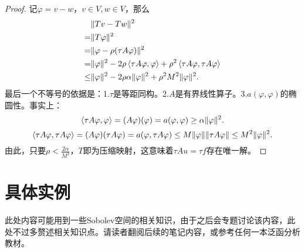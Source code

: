 \begin{proof}
  记$\varphi=v-w$，$v\in V,w\in V$，那么
  \begin{equation}
    \begin{aligned}
      &\|Tv-Tw\|^{2}\\
      =&\|T\varphi\|^{2}\\
      =&\|\varphi-\rho(\tau A\varphi)\|^{2}\\
      =&\|\varphi\|^{2}-2\rho\left<\tau A\varphi,\varphi\right>+\rho^{2}\left<\tau A\varphi,\tau A\varphi\right>\\
      \le& \|\varphi\|^2-2\rho\alpha\|\varphi\|^{2}+\rho^{2}M^{2}\|\varphi\|^{2}.
    \end{aligned}
  \end{equation}
  最后一个不等号的依据是：1.$\tau$是等距同构。2.$A$是有界线性算子。3.$a(\varphi,\varphi)$的椭圆性。事实上：
  \begin{equation}
    \left<\tau A\varphi,\varphi\right>=(A\varphi)(\varphi)=a(\varphi,\varphi)\ge \alpha\|\varphi\|^{2}.
  \end{equation}
  \begin{equation}
    \left<\tau A\varphi,\tau A\varphi\right>=(A\varphi)(\tau A\varphi)=a(\varphi,\tau A\varphi)\le M\|\varphi\|\|\tau A\varphi\|\le M^{2}\|\varphi\|^{2}.
  \end{equation}
  由此，只要$\rho<\frac{2\alpha}{M^{2}}$，$T$即为压缩映射，这意味着$\tau Au=\tau f$存在唯一解。
\end{proof}
\section{具体实例}
\begin{remark}
  此处内容可能用到一些Sobolev空间的相关知识，由于之后会专题讨论该内容，此处不过多赘述相关知识点。请读者翻阅后续的笔记内容，或参考任何一本泛函分析教材。
\end{remark}
